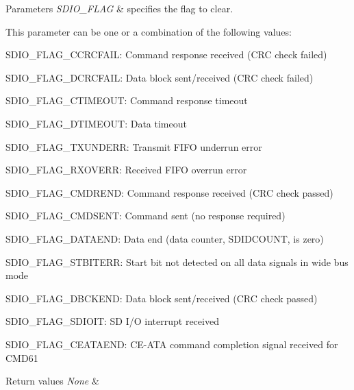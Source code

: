 \begin{DoxyParams}{Parameters}
{\em S\+D\+I\+O\+\_\+\+F\+L\+AG} & specifies the flag to clear.\\
\hline
\end{DoxyParams}
This parameter can be one or a combination of the following values\+: \begin{DoxyItemize}
\item S\+D\+I\+O\+\_\+\+F\+L\+A\+G\+\_\+\+C\+C\+R\+C\+F\+A\+IL\+: Command response received (C\+RC check failed) \item S\+D\+I\+O\+\_\+\+F\+L\+A\+G\+\_\+\+D\+C\+R\+C\+F\+A\+IL\+: Data block sent/received (C\+RC check failed) \item S\+D\+I\+O\+\_\+\+F\+L\+A\+G\+\_\+\+C\+T\+I\+M\+E\+O\+UT\+: Command response timeout \item S\+D\+I\+O\+\_\+\+F\+L\+A\+G\+\_\+\+D\+T\+I\+M\+E\+O\+UT\+: Data timeout \item S\+D\+I\+O\+\_\+\+F\+L\+A\+G\+\_\+\+T\+X\+U\+N\+D\+E\+RR\+: Transmit F\+I\+FO underrun error \item S\+D\+I\+O\+\_\+\+F\+L\+A\+G\+\_\+\+R\+X\+O\+V\+E\+RR\+: Received F\+I\+FO overrun error \item S\+D\+I\+O\+\_\+\+F\+L\+A\+G\+\_\+\+C\+M\+D\+R\+E\+ND\+: Command response received (C\+RC check passed) \item S\+D\+I\+O\+\_\+\+F\+L\+A\+G\+\_\+\+C\+M\+D\+S\+E\+NT\+: Command sent (no response required) \item S\+D\+I\+O\+\_\+\+F\+L\+A\+G\+\_\+\+D\+A\+T\+A\+E\+ND\+: Data end (data counter, S\+D\+I\+D\+C\+O\+U\+NT, is zero) \item S\+D\+I\+O\+\_\+\+F\+L\+A\+G\+\_\+\+S\+T\+B\+I\+T\+E\+RR\+: Start bit not detected on all data signals in wide bus mode \item S\+D\+I\+O\+\_\+\+F\+L\+A\+G\+\_\+\+D\+B\+C\+K\+E\+ND\+: Data block sent/received (C\+RC check passed) \item S\+D\+I\+O\+\_\+\+F\+L\+A\+G\+\_\+\+S\+D\+I\+O\+IT\+: SD I/O interrupt received \item S\+D\+I\+O\+\_\+\+F\+L\+A\+G\+\_\+\+C\+E\+A\+T\+A\+E\+ND\+: C\+E-\/\+A\+TA command completion signal received for C\+M\+D61 
\begin{DoxyRetVals}{Return values}
{\em None} & \\
\hline
\end{DoxyRetVals}
\end{DoxyItemize}
\mbox{\label{group___s_d_i_o___exported___functions_ga048e07fd86321cd01b2a22c071c3149b}} 
